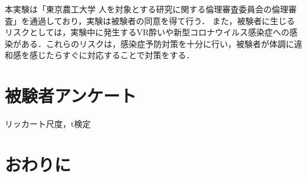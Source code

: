     
    本実験は「東京農工大学 人を対象とする研究に関する倫理審査委員会の倫理審査」を通過しており，実験は被験者の同意を得て行う．
    また，被験者に生じるリスクとしては，実験中に発生するVR酔いや新型コロナウイルス感染症への感染がある．これらのリスクは，感染症予防対策を十分に行い，被験者が体調に違和感を感じたらすぐに対応することで対策をする．
    
    
\section{被験者アンケート}
リッカート尺度，t検定


\section{おわりに}